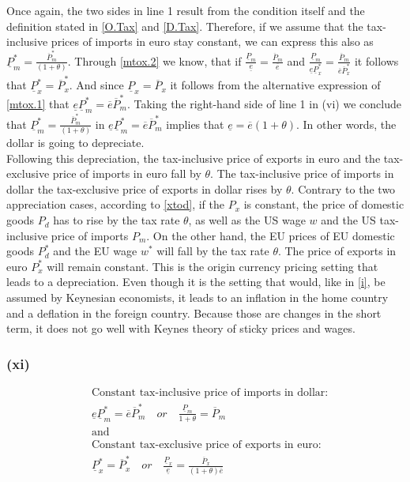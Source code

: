 Once again, the two sides in line 1 result from the condition itself and the definition stated in \eqref{O.Tax} and \eqref{D.Tax}. Therefore, if we assume that the tax-inclusive prices of imports in euro stay constant, we can express this also as $\underline P^*_m  = \frac{\overline P^*_m}{(1+\theta)}$. Through \eqref{mtox.2} we know, that if $\frac{\underline P_m}{\underline e} = \frac{\overline P_m}{\overline e}$ and $\frac{\underline P_m}{\underline e \underline P_x^*} = \frac{\overline P_m}{\overline e \overline P_x^*}$ it follows that $\underline P^*_x = \overline P^*_x$. And since $\underline P_x = \overline P_x$ it follows from the alternative expression of \eqref{mtox.1} that $\underline e \underline P^*_m = \overline e \overline P_m^*$. Taking the right-hand side of line 1 in (vi) we conclude that $\underline P^*_m  = \frac{\overline P^*_m}{(1+\theta)}$ in $\underline e \underline P^*_m = \overline e \overline P_m^*$ implies that $\underline e = \overline e (1+\theta)$. In other words, the dollar is going to depreciate. \\
Following this depreciation, the tax-inclusive price of exports in euro and the tax-exclusive price of imports in euro fall by $\theta$. The tax-inclusive price of imports in dollar the tax-exclusive price of exports in dollar rises by $\theta$.
Contrary to the two appreciation cases, according to \eqref{xtod}, if the $P_x$ is constant, the price of domestic goods $P_d$ has to rise by the tax rate $\theta$, as well as the US wage $w$ and the US tax-inclusive price of imports $P_m$. On the other hand, the EU prices of EU domestic goods $P^*_d$ and the EU wage $w^*$ will fall by the tax rate $\theta$. The price of exports in euro $P^*_x$ will remain constant. 
This is the origin currency pricing setting that leads to a depreciation. Even though it is the setting that would, like in \eqref{i}, be assumed by Keynesian economists, it leads to an inflation in the home country and a deflation in the foreign country. Because those are changes in the short term, it does not go well with Keynes theory of sticky prices and wages. 

\subsubsection*{(xi)}
\begin{equation}\label{xi}
\begin{aligned}
&\text{Constant tax-inclusive price of imports in dollar:}\\ &\underline e \underline P^*_m = \overline e \overline P^*_m \quad or \quad \frac{\underline P_m}{1+\theta} = \overline P_m \\
&\text{and}\\
&\text{Constant tax-exclusive price of exports in euro:}\\ &\underline P^*_x = \overline P^*_x \quad or \quad \frac{\underline P_x}{\underline e} = \frac{\overline P_x}{(1+\theta)\overline e}
\end{aligned}
\end{equation}

